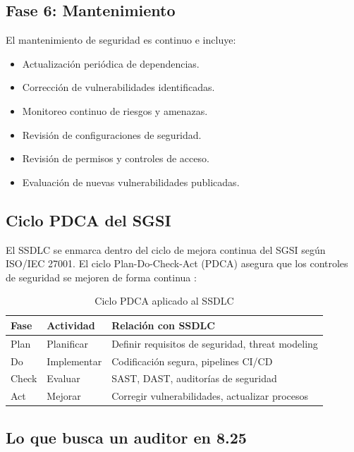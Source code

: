\subsection{Fase 6: Mantenimiento}

El mantenimiento de seguridad es continuo e incluye:

\begin{itemize}
    \item Actualización periódica de dependencias.
    \item Corrección de vulnerabilidades identificadas.
    \item Monitoreo continuo de riesgos y amenazas.
    \item Revisión de configuraciones de seguridad.
    \item Revisión de permisos y controles de acceso.
    \item Evaluación de nuevas vulnerabilidades publicadas.
\end{itemize}

\subsection{Ciclo PDCA del SGSI}

El SSDLC se enmarca dentro del ciclo de mejora continua del SGSI según ISO/IEC 27001. El ciclo Plan-Do-Check-Act (PDCA) asegura que los controles de seguridad se mejoren de forma continua \cite{nist800218}:

\begin{table}[h]
\centering
\small
\begin{tabular}{|l|l|p{5.5cm}|}
\hline
\textbf{Fase} & \textbf{Actividad} & \textbf{Relación con SSDLC} \\
\hline
Plan & Planificar & Definir requisitos de seguridad, threat modeling \\
Do & Implementar & Codificación segura, pipelines CI/CD \\
Check & Evaluar & SAST, DAST, auditorías de seguridad \\
Act & Mejorar & Corregir vulnerabilidades, actualizar procesos \\
\hline
\end{tabular}
\caption{Ciclo PDCA aplicado al SSDLC}
\label{tab:pdca}
\end{table}

\subsection{Lo que busca un auditor en 8.25}

